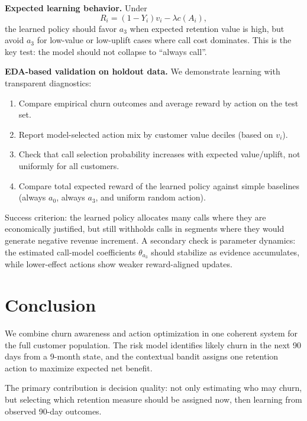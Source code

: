 \documentclass[11pt,a4paper]{article}
\begin{document}
\textbf{Expected learning behavior.} Under
\[
R_i=(1-Y_i)v_i-\lambda c(A_i),
\]
the learned policy should favor $a_3$ when expected retention value is high, but avoid $a_3$ for low-value or low-uplift cases where call cost dominates. This is the key test: the model should not collapse to ``always call''.

\textbf{EDA-based validation on holdout data.} We demonstrate learning with transparent diagnostics:
\begin{enumerate}
    \item Compare empirical churn outcomes and average reward by action on the test set.
    \item Report model-selected action mix by customer value deciles (based on $v_i$).
    \item Check that call selection probability increases with expected value/uplift, not uniformly for all customers.
    \item Compare total expected reward of the learned policy against simple baselines (always $a_0$, always $a_3$, and uniform random action).
\end{enumerate}
Success criterion: the learned policy allocates many calls where they are economically justified, but still withholds calls in segments where they would generate negative revenue increment. A secondary check is parameter dynamics: the estimated call-model coefficients $\theta_{a_3}$ should stabilize as evidence accumulates, while lower-effect actions show weaker reward-aligned updates.

\section{Conclusion}
We combine churn awareness and action optimization in one coherent system for the full customer population. The risk model identifies likely churn in the next 90 days from a 9-month state, and the contextual bandit assigns one retention action to maximize expected net benefit.

The primary contribution is decision quality: not only estimating who may churn, but selecting which retention measure should be assigned now, then learning from observed 90-day outcomes.
\end{document}
